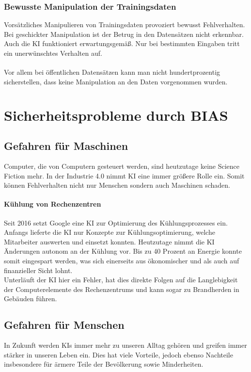 \documentclass[12pt,oneside,a4paper,parskip]{scrbook}
\begin{document}
\subsection{Bewusste Manipulation der Trainingsdaten}
\label{section:manipulationInData}
Vorsätzliches Manipulieren von Trainingsdaten provoziert bewusst Fehlverhalten. Bei geschickter Manipulation ist der Betrug in den Datensätzen nicht erkennbar. Auch die KI funktioniert erwartungsgemäß. Nur bei bestimmten Eingaben tritt ein unerwünschtes Verhalten auf. \\\\
Vor allem bei öffentlichen Datensätzen kann man nicht hundertprozentig sicherstellen, dass keine Manipulation an den Daten vorgenommen wurden.
\chapter{Sicherheitsprobleme durch BIAS}
\section{Gefahren für Maschinen}
Computer, die von Computern gesteuert werden, sind heutzutage keine Science Fiction mehr. In der Industrie 4.0 nimmt KI eine immer größere Rolle ein. Somit können Fehlverhalten nicht nur Menschen sondern auch Maschinen schaden.
\subsubsection{Kühlung von Rechenzentren}
Seit 2016 setzt Google eine KI zur Optimierung des Kühlungsprozesses ein. Anfangs lieferte die KI nur Konzepte zur Kühlungsoptimierung, welche Mitarbeiter auswerten und einsetzt konnten. Heutzutage nimmt die KI Änderungen autonom an der Kühlung vor. Bis zu 40 Prozent an Energie konnte somit eingespart werden, was sich einerseits aus ökonomischer und als auch auf finanzieller Sicht lohnt.\\
Unterläuft der KI hier ein Fehler, hat dies direkte Folgen auf die Langlebigkeit der Computerelemente des Rechenzentrums und kann sogar zu Brandherden in Gebäuden führen.
\section{Gefahren für Menschen}
In Zukunft werden KIs immer mehr zu unseren Alltag gehören und greifen immer stärker in unseren Leben ein. Dies hat viele Vorteile, jedoch ebenso Nachteile insbesondere für ärmere Teile der Bevölkerung sowie Minderheiten.
\end{document}
